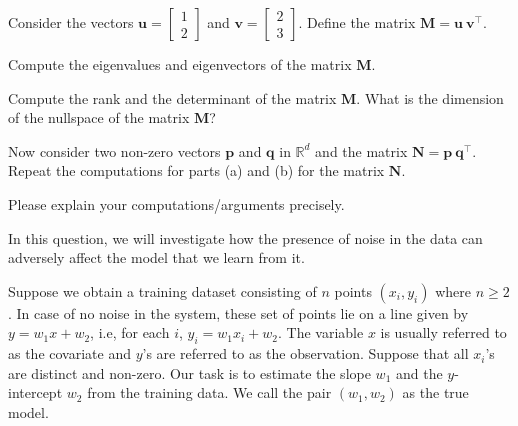 \documentclass[preview]{standalone}
\begin{document}
\newcommand{\myvec}[1]{\mathbf{#1}}
\newcommand{\mymat}[1]{\mathbf{#1}}

Consider the vectors $\myvec{u} = \begin{bmatrix} 1 \\ 2 \end{bmatrix}$ and $\myvec{v} = \begin{bmatrix} 2 \\ 3 \end{bmatrix}$.
Define the matrix $\mymat{M} = \myvec{u} \ \myvec{v}^{\top}$.



\begin{Parts}
	
\Part Compute the eigenvalues and eigenvectors of the matrix $\mymat{M}$.




\Part Compute the rank and the determinant of the matrix $\mymat{M}$.
What is the dimension of the nullspace of the matrix $\mymat{M}$?



\Part Now consider two non-zero vectors $\myvec{p}$ and $\myvec{q}$ in $\mathbb{R}^d$ and the matrix $\mymat{N} = \myvec{p}\ \myvec{q}^{\top}$. 
Repeat the computations for parts (a) and (b) for the matrix $\mymat{N}$.



\end{Parts}

Please explain your computations/arguments precisely.


\newcommand{\slope}{w_1}
\newcommand{\intercept}{w_2}
\newcommand{\X}{\mathbf{X}}
\newcommand{\y}{\mathbf{y}}
\newcommand{\w}{\mathbf{w}}


In this question, we will investigate how the presence of noise in the data can adversely affect the model that we learn from it.

Suppose we obtain a training dataset consisting of $n$ points $(x_i, y_i)$ where $n \geq 2$.
In case of no noise in the system, these set of points lie on a line given by $y = w_1x + w_2$, i.e, for each $i$, $y_i = w_1x_i + w_2$.
The variable $x$ is usually referred to as the covariate and $y$'s are referred to as the observation.
Suppose that all $x_i$'s are distinct and non-zero. Our task is to estimate the slope $w_1$ and the $y$-intercept $w_2$ from the training data.
We call the pair $(w_1, w_2)$ as the true model.
\end{document}
